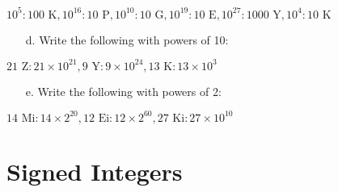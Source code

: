 \documentclass[12pt]{article}
\begin{document}
    \par $10^{5}: \boxed{\text{100 K}}, 10^{16}: \boxed{\text{10 P}}, 10^{10}:
    \boxed{\text{10 G}}, 10^{19}: \boxed{\text{10 E}}, 10^{27}:
    \boxed{\text{1000 Y}}, 10^{4}: \boxed{\text{10 K}}$
    \begin{itemize}
        \item[d.] Write the following with powers of 10:
    \end{itemize}
    \par $\text{21 Z}: \boxed{21 \times 10^{21}}, \text{9 Y}: \boxed{9 \times 10^{24}},
    \text{13 K}: \boxed{13 \times 10^{3}}$
    \begin{itemize}
        \item[e.] Write the following with powers of 2:
    \end{itemize}
    \par $\text{14 Mi}: \boxed{14 \times 2^{20}}, \text{12 Ei}: \boxed{12 \times
    2^{60}}, \text{27 Ki}: \boxed{27 \times 10^{10}}$
    \section{Signed Integers}
\end{document}
